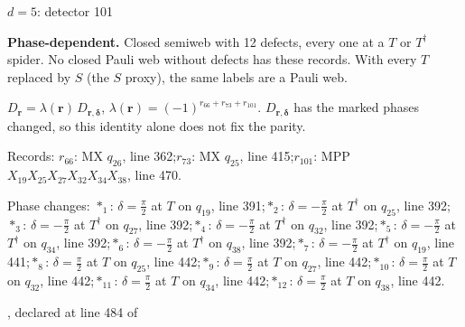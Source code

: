 \label{d5_det101}
{\Large $d=5$: detector 101}\par
\textbf{Phase-dependent.} Closed semiweb with 12 defects, every one at a $T$ or $T^\dagger$ spider. No closed Pauli web without defects has these records. With every $T$ replaced by $S$ (the $S$ proxy), the same labels are a Pauli web.
\begin{center}
\end{center}
\vspace{-1mm}
$D_{\boldsymbol r}=\lambda(\boldsymbol r)\,D_{\boldsymbol r,\boldsymbol\delta}$, \quad $\lambda(\boldsymbol r)=(-1)^{r_{66}+r_{73}+r_{101}}$. \qquad $D_{\boldsymbol r,\boldsymbol\delta}$ has the marked phases changed, so this identity alone does not fix the parity.
\par\smallskip\begin{minipage}{.98\linewidth}\small Records: $r_{66}$: MX $q_{26}$, line 362;\quad $r_{73}$: MX $q_{25}$, line 415;\quad $r_{101}$: MPP $X_{19}X_{25}X_{27}X_{32}X_{34}X_{38}$, line 470.\end{minipage}
\par\smallskip\begin{minipage}{.98\linewidth}\small Phase changes: $\ast_{1}$: $\delta=\frac{\pi}{2}$ at $T$ on $q_{19}$, line 391;\quad $\ast_{2}$: $\delta=-\frac{\pi}{2}$ at $T^\dagger$ on $q_{25}$, line 392;\quad $\ast_{3}$: $\delta=-\frac{\pi}{2}$ at $T^\dagger$ on $q_{27}$, line 392;\quad $\ast_{4}$: $\delta=-\frac{\pi}{2}$ at $T^\dagger$ on $q_{32}$, line 392;\quad $\ast_{5}$: $\delta=-\frac{\pi}{2}$ at $T^\dagger$ on $q_{34}$, line 392;\quad $\ast_{6}$: $\delta=-\frac{\pi}{2}$ at $T^\dagger$ on $q_{38}$, line 392;\quad $\ast_{7}$: $\delta=-\frac{\pi}{2}$ at $T^\dagger$ on $q_{19}$, line 441;\quad $\ast_{8}$: $\delta=\frac{\pi}{2}$ at $T$ on $q_{25}$, line 442;\quad $\ast_{9}$: $\delta=\frac{\pi}{2}$ at $T$ on $q_{27}$, line 442;\quad $\ast_{10}$: $\delta=\frac{\pi}{2}$ at $T$ on $q_{32}$, line 442;\quad $\ast_{11}$: $\delta=\frac{\pi}{2}$ at $T$ on $q_{34}$, line 442;\quad $\ast_{12}$: $\delta=\frac{\pi}{2}$ at $T$ on $q_{38}$, line 442.\end{minipage}
\vfill
{\footnotesize\texttt{}, declared at line 484 of \texttt{}}
\newpage

